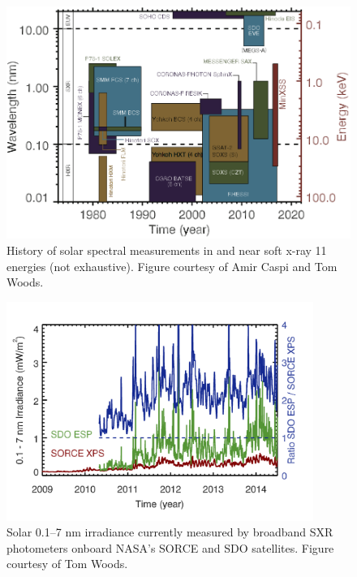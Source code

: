 \begin{figure}[!h]
    \begin{center}
	    \includegraphics[width=140mm]{Images/SxrHistory.png}
    \end{center}
    \caption[History of solar SXR measurements]{
        History of solar spectral measurements in and near soft x-ray 11 energies (not exhaustive). Figure courtesy of 
        Amir Caspi and Tom Woods. 
    }
    \label{fig:sxrhistory}
\end{figure}

\begin{figure}[!h]
    \begin{center}
	    \includegraphics[width=100mm]{Images/XpsDiscrepancy.png}
    \end{center}
    \caption[XPS vs ESP SXR measurements]{
        Solar 0.1–7 nm irradiance currently measured by broadband SXR photometers onboard NASA’s SORCE and SDO satellites. 
        Figure courtesy of Tom Woods.  
    }
    \label{fig:xpsdiscrepancy}
\end{figure}

